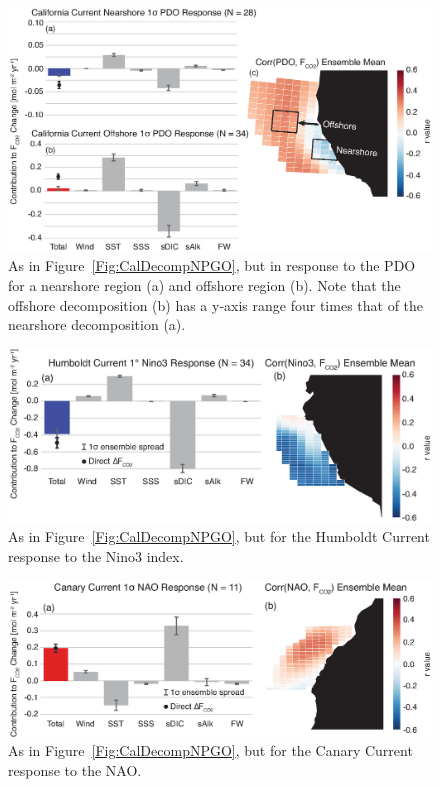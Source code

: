 \documentclass[hvmath, online,bgd]{copernicus_discussions}
\begin{document}
\clearpage
\begin{figure}[t]
	\includegraphics[width=12cm]{figures/figure6.eps}
	\caption{As in Figure~\ref{Fig:CalDecompNPGO}, but in response to the PDO for a nearshore region (a) and offshore region (b). Note that the offshore decomposition (b) has a y-axis range four times that of the nearshore decomposition (a).}
	\label{Fig:CalDecompPDO}
\end{figure}

\clearpage
\begin{figure}[t]
	\includegraphics[width=12cm]{figures/figure7.eps}
	\caption{As in Figure~\ref{Fig:CalDecompNPGO}, but for the Humboldt Current response to the Nino3 index.}
	\label{Fig:HumDecompENSO}
\end{figure}

\clearpage
\begin{figure}[t]
	\includegraphics[width=12cm]{figures/figure8.eps}
	\caption{As in Figure~\ref{Fig:CalDecompNPGO}, but for the Canary Current response to the NAO.}
	\label{Fig:CanDecompNAO}
\end{figure}
\end{document}
